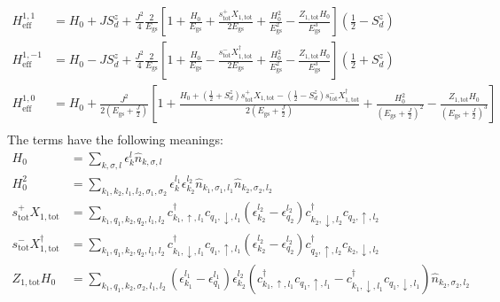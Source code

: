 \documentclass[12pt]{revtex4-2}
\begin{document}
\begin{align}
	H_\text{eff}^{1, 1} &= H_0 + J S_d^z + \frac{J^2}{4}\frac{2}{E_\text{gs}}\left[1 + \frac{H_0}{E_\text{gs}} + \frac{s^+_\text{tot}X_{1,\text{tot}}}{2 E_\text{gs}} + \frac{H_0^2 }{E_\text{gs}^2} - \frac{Z_{1,\text{tot}} H_0}{E_\text{gs}^3}\right] \left(\frac{1}{2} - S_d^z\right) \\
	H_\text{eff}^{1, -1} &= H_0 - J S_d^z + \frac{J^2}{4}\frac{2}{E_\text{gs}}\left[1 + \frac{H_0}{E_\text{gs}}  - \frac{s^-_\text{tot}X^\dagger_{1,\text{tot}}}{2 E_\text{gs}}  + \frac{H_0^2}{E_\text{gs}^2}  - \frac{ Z_{1,\text{tot}} H_0}{E_\text{gs}^3}\right] \left(\frac{1}{2} + S_d^z\right) \\
	H_\text{eff}^{1, 0} &= H_0 + \frac{J^2}{2\left(E_\text{gs} + \frac{J}{2}\right)}\left[1 + \frac{ H_0 + \left(\frac{1}{2} + S_d^z\right) s^+_\text{tot}X_{1,\text{tot}} - \left(\frac{1}{2} - S_d^z\right) s^-_\text{tot}X^\dagger_{1,\text{tot}}}{2 \left(E_\text{gs} + \frac{J}{2}\right)} + \frac{H_0^2}{\left(E_\text{gs} + \frac{J}{2}\right)^2} - \frac{Z_{1,\text{tot}} H_0}{\left(E_\text{gs} + \frac{J}{2}\right)^3} \right] \\
\end{align}
The terms have the following meanings:
\begin{align}
	H_0 &= \sum_{k,\sigma,l}\epsilon_k^l \hat n_{k,\sigma,l}\\
	H_0^2 &= \sum_{k_1,k_2,l_1,l_2,\sigma_1,\sigma_2}\epsilon_k^{l_1}\epsilon_{k_2}^{l_2} \hat n_{k_1,\sigma_1,l_1}\hat n_{k_2,\sigma_2,l_2}\\
	s^+_\text{tot}X_{1,\text{tot}} &= \sum_{k_1,q_1,k_2,q_2,l_1,l_2}c^\dagger_{k_1, \uparrow, l_1}c_{q_1, \downarrow, l_1} \left(\epsilon_{k_2}^{l_2} - \epsilon_{q_2}^{l_2}\right) c^\dagger_{k_2, \downarrow, l_2}c_{q_2, \uparrow, l_2}\\
	s^-_\text{tot}X^\dagger_{1,\text{tot}} &= \sum_{k_1,q_1,k_2,q_2,l_1,l_2}c^\dagger_{k_1, \downarrow, l_1}c_{q_1, \uparrow, l_1} \left(\epsilon_{k_2}^{l_2} - \epsilon_{q_2}^{l_2}\right) c^\dagger_{q_2, \uparrow, l_2}c_{k_2, \downarrow, l_2}\\
	Z_{1,\text{tot}} H_0 &= \sum_{k_1,q_1,k_2,\sigma_2,l_1,l_2}\left(\epsilon_{k_1}^{l_1} - \epsilon_{q_1}^{l_1}\right) \epsilon_{k_2}^{l_2} \left(c^\dagger_{k_1, \uparrow, l_1}c_{q_1, \uparrow, l_1} - c^\dagger_{k_1, \downarrow, l_1}c_{q_1, \downarrow, l_1}\right) \hat n_{k_2,\sigma_2,l_2}\\
\end{align}
\end{document}
